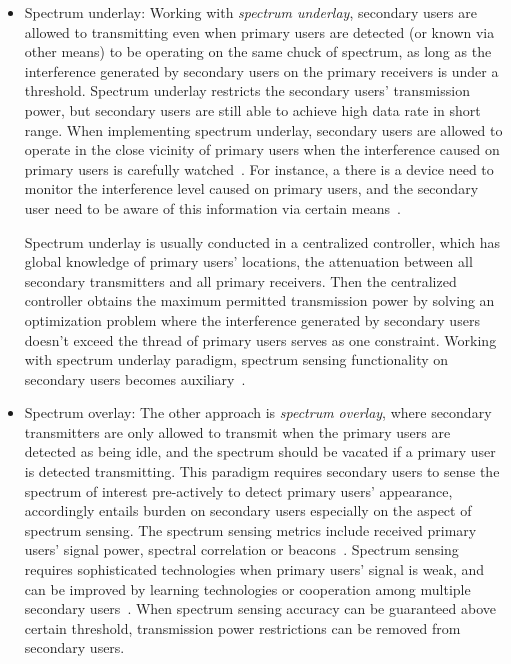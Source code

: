 \begin{itemize}
\item \label{underlay}  Spectrum underlay:
Working with \textit{spectrum underlay}, secondary users are allowed to transmitting even when primary users are detected (or known via other means) to be operating on the same chuck of spectrum, as long as the interference generated by secondary users on the primary receivers is under a threshold.
Spectrum underlay restricts the secondary users' transmission power, but secondary users are still able to achieve high data rate in short range.
When implementing spectrum underlay, secondary users are allowed to operate in the close vicinity of primary users when the interference caused on primary users is carefully watched~\cite{Ellingsaeter2012_Increasing_Available}.
For instance, a there is a device need to monitor the interference level caused on primary users, and the secondary user need to be aware of this information via certain means~\cite{HoangPowerChannel2010}.

Spectrum underlay is usually conducted in a centralized controller, which has global knowledge of primary users' locations, the attenuation between all secondary transmitters and all primary receivers.
Then the centralized controller obtains the maximum permitted transmission power by solving an optimization problem where the interference generated by secondary users doesn't exceed the thread of primary users serves as one constraint.
Working with spectrum underlay paradigm, spectrum sensing functionality on secondary users becomes auxiliary~\cite{FCC_2010_sedond_memorandumm, ecc159}.





\item \label{overlay} Spectrum overlay:
The other approach is \textit{spectrum overlay}, where secondary transmitters are only allowed to transmit when the primary users are detected as being idle, and the spectrum should be vacated if a primary user is detected transmitting.
This paradigm requires secondary users to sense the spectrum of interest pre-actively to detect primary users' appearance, accordingly entails burden on secondary users especially on the aspect of spectrum sensing.
The spectrum sensing metrics include received primary users' signal power, spectral correlation or beacons~\cite{crnsensing_09}.
Spectrum sensing requires sophisticated technologies when primary users' signal is weak, and can be improved by learning technologies or cooperation among multiple secondary users~\cite{coorperativeSensing_Akyildiz11}.
When spectrum sensing accuracy can be guaranteed above certain threshold, transmission power restrictions can be removed from  secondary users.
\end{itemize}

